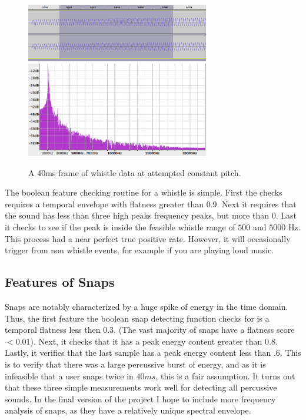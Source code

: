 \documentclass[DIV=calc, paper=a4, fontsize=11pt, twocolumn]{scrartcl}   %
\begin{document}
   \begin{figure}[h]
   \centering
   \includegraphics[width=80mm]{figures/whistle_frame_t.png}
   \includegraphics[width=80mm]{figures/whistle_frame_f.png}
   \caption{A 40ms frame of whistle data at attempted constant pitch.}
   \label{overflow}
   \end{figure}
   \par The boolean feature checking routine for a whistle is simple. First the checks requires a temporal envelope with flatness greater than $0.9$. Next it requires that the sound has less than three high peaks frequency peaks, but more than 0. Last it checks to see if the peak is inside the feasible whistle range of $500$ and $5000$ Hz. This process had a near perfect true positive rate. However, it will occasionally trigger from non whistle events, for example if you are playing loud music.

   \subsection{Features of Snaps}

   Snaps are notably characterized by a huge spike of energy in the time domain. Thus, the first feature the boolean snap detecting function checks for is a temporal flatness less then $0.3$. (The vast majority of snaps have a flatness score $<0.01$). Next, it checks that it has a peak energy content greater than $0.8$. Lastly, it verifies that the last sample has a peak energy content less than $.6$. This is to verify that there was a large percussive burst of energy, and as it is infeasible that a user snaps twice in $40ms$, this is a fair assumption. It turns out that these three simple measurements work well for detecting all percussive sounds. In the final version of the project I hope to include more frequency analysis of snaps, as they have a relatively unique spectral envelope.
\end{document}
